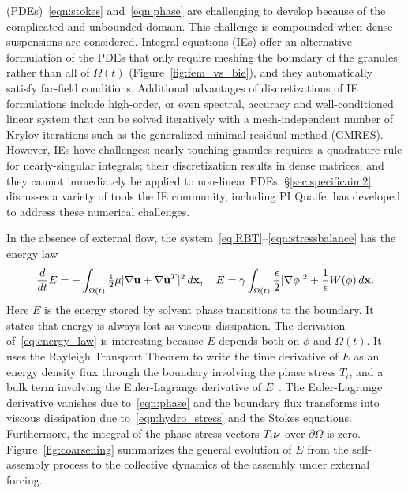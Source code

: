 (PDEs)~\eqref{eqn:stokes} and~\eqref{eqn:phase} are challenging to
develop because of the complicated and unbounded domain. This challenge
is compounded when dense suspensions are considered.
Integral equations
(IEs) offer an alternative formulation of the PDEs that only require
meshing the boundary of the granules rather than all of $\Omega(t)$
(Figure~\ref{fig:fem_vs_bie}), and they automatically satisfy far-field
conditions. Additional advantages of discretizations of IE formulations
include high-order, or even spectral, accuracy and well-conditioned
linear system that can be solved iteratively with a mesh-independent
number of Krylov iterations such as the generalized minimal residual
method (GMRES). However, IEs have challenges: nearly touching granules
requires a quadrature rule for nearly-singular integrals; their
discretization results in dense matrices; and they cannot immediately be
applied to non-linear PDEs. \S\ref{sec:specificaim2} discusses a variety
of tools the IE community, including PI Quaife, has developed to address
these numerical challenges.

In the absence of external flow, the
system~\eqref{eq:RBT}--\eqref{eqn:stressbalance} has the energy law
\begin{align}
\label{eq:energy_law}
  \frac{d}{dt}E
  = - \int_{\Omega(t)}\tfrac{1}{2}\mu|\nabla \mathbf{u} + \nabla
  \mathbf{u}^T|^2 \,d\mathbf{x},\quad
    E = \gamma \int_{\Omega(t)}
  \frac{\epsilon}{2} |\nabla \phi|^2 + \frac{1}{\epsilon} W(\phi) \,d\mathbf{x}.
\end{align}
Here $E$ is the energy stored by solvent phase transitions to the
boundary. It states that energy is always lost as viscous
dissipation. The derivation of~\eqref{eq:energy_law} is interesting
because $E$ depends both on $\phi$ and $\Omega(t)$. It uses the Rayleigh
Transport Theorem to write the time derivative of $E$ as an energy
density flux through the boundary involving the phase stress $T_i$, and
a bulk term involving the Euler-Lagrange derivative of
$E$~\cite{Fu2018_SIAM}. The Euler-Lagrange derivative vanishes due
to~\eqref{eqn:phase} and the boundary flux transforms into viscous
dissipation due to~\eqref{eqn:hydro_stress} and the Stokes equations.
Furthermore, the integral of the phase stress vectors $T_i\boldsymbol{\nu}$ over
$\partial \Omega$ is zero. Figure~\ref{fig:coarsening} summarizes the
general evolution of $E$ from the self-assembly process to the
collective dynamics of the assembly under external forcing.


